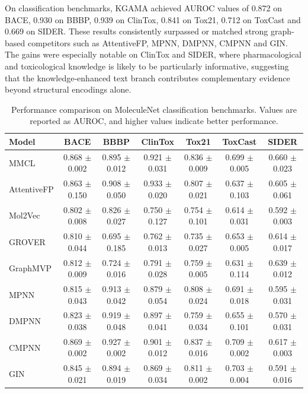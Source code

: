\documentclass[webpdf,contemporary,large]{oup-authoring-template}%
\begin{document}
On classification benchmarks, KGAMA achieved AUROC values of 0.872 on BACE, 0.930 on BBBP, 0.939 on ClinTox, 0.841 on Tox21, 0.712 on ToxCast and 0.669 on SIDER. These results consistently surpassed or matched strong graph-based competitors such as AttentiveFP, MPNN, DMPNN, CMPNN and GIN. The gains were especially notable on ClinTox and SIDER, where pharmacological and toxicological knowledge is likely to be particularly informative, suggesting that the knowledge-enhanced text branch contributes complementary evidence beyond structural encodings alone.

\begin{table}[t]
\caption{Performance comparison on MoleculeNet classification benchmarks. Values are reported as AUROC, and higher values indicate better performance.\label{tab:classification-results}}
\tabcolsep=3pt
\begin{tabular*}{\textwidth}{@{\extracolsep{\fill}}lcccccc@{\extracolsep{\fill}}}
\toprule
Model & BACE & BBBP & ClinTox & Tox21 & ToxCast & SIDER \\
\midrule
MMCL & 0.868 $\pm$ 0.002 & 0.895 $\pm$ 0.012 & 0.921 $\pm$ 0.031 & 0.836 $\pm$ 0.009 & 0.699 $\pm$ 0.005 & 0.660 $\pm$ 0.023 \\
AttentiveFP & 0.863 $\pm$ 0.150 & 0.908 $\pm$ 0.050 & 0.933 $\pm$ 0.020 & 0.807 $\pm$ 0.021 & 0.637 $\pm$ 0.103 & 0.605 $\pm$ 0.061 \\
Mol2Vec & 0.802 $\pm$ 0.008 & 0.826 $\pm$ 0.027 & 0.750 $\pm$ 0.127 & 0.754 $\pm$ 0.101 & 0.614 $\pm$ 0.031 & 0.592 $\pm$ 0.003 \\
GROVER & 0.810 $\pm$ 0.044 & 0.695 $\pm$ 0.185 & 0.762 $\pm$ 0.013 & 0.735 $\pm$ 0.027 & 0.653 $\pm$ 0.005 & 0.614 $\pm$ 0.017 \\
GraphMVP & 0.812 $\pm$ 0.009 & 0.724 $\pm$ 0.016 & 0.791 $\pm$ 0.028 & 0.759 $\pm$ 0.005 & 0.631 $\pm$ 0.114 & 0.639 $\pm$ 0.012 \\
MPNN & 0.815 $\pm$ 0.043 & 0.913 $\pm$ 0.042 & 0.879 $\pm$ 0.054 & 0.808 $\pm$ 0.024 & 0.691 $\pm$ 0.018 & 0.595 $\pm$ 0.031 \\
DMPNN & 0.823 $\pm$ 0.038 & 0.919 $\pm$ 0.048 & 0.897 $\pm$ 0.041 & 0.759 $\pm$ 0.034 & 0.655 $\pm$ 0.101 & 0.570 $\pm$ 0.031 \\
CMPNN & 0.869 $\pm$ 0.002 & 0.927 $\pm$ 0.002 & 0.901 $\pm$ 0.012 & 0.837 $\pm$ 0.016 & 0.709 $\pm$ 0.002 & 0.617 $\pm$ 0.003 \\
GIN & 0.845 $\pm$ 0.021 & 0.894 $\pm$ 0.019 & 0.869 $\pm$ 0.034 & 0.811 $\pm$ 0.002 & 0.703 $\pm$ 0.004 & 0.591 $\pm$ 0.016 \\

\end{tabular*}
\end{table}
\end{document}
